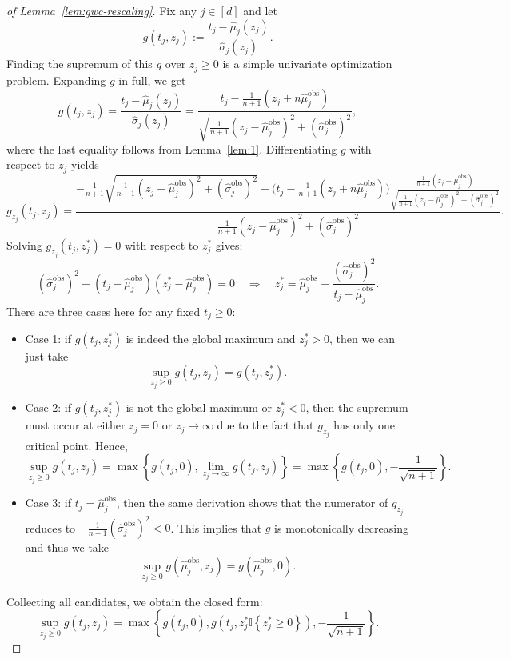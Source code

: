 \begin{proof}[of Lemma~\ref{lem:gwc-rescaling}]
Fix any $j\in [d]$ and let
\[
g(t_j, z_j) := \frac{t_j - \hat{\mu}_{j}(z_j)}{\hat{\sigma}_{j}(z_j)}.
\]
Finding the supremum of this $g$ over $z_j \geq 0$ is a simple univariate optimization problem. Expanding $g$ in full, we get
\[
g(t_j, z_j) = \frac{t_j - \hat{\mu}_{j}(z_j)}{\hat{\sigma}_{j}(z_j)} = \frac{t_j-\frac{1}{n+1}(z_j+n\hat{\mu}^\mathrm{obs}_j)}{\sqrt{\frac{1}{n+1}(z_j-\hat{\mu}^\mathrm{obs}_j)^2+(\hat{\sigma}^\mathrm{obs}_j)^2}},
\]
where the last equality follows from Lemma~\ref{lem:1}.
Differentiating $g$ with respect to $z_j$ yields
\[
g_{z_j}(t_j, z_j) = 
\frac{-\tfrac{1}{n+1}\sqrt{\frac{1}{n+1}(z_j-\hat{\mu}^\mathrm{obs}_j)^2+(\hat{\sigma}^\mathrm{obs}_j)^2} 
- \big(t_j - \tfrac{1}{n+1}(z_j+n\hat{\mu}^\mathrm{obs}_j)\big)\tfrac{\tfrac{1}{n+1}(z_j-\hat{\mu}^\mathrm{obs}_j)}{\sqrt{\frac{1}{n+1}(z_j-\hat{\mu}^\mathrm{obs}_j)^2+(\hat{\sigma}^\mathrm{obs}_j)^2}}}
{\frac{1}{n+1}(z_j-\hat{\mu}^\mathrm{obs}_j)^2+(\hat{\sigma}^\mathrm{obs}_j)^2}.
\]
Solving $g_{z_j}(t_j,z^*_j)=0$ with respect to $z^*_j$ gives:
\[
(\hat{\sigma}^\mathrm{obs}_j)^2 + (t_j-\hat{\mu}^\mathrm{obs}_j)(z^*_j-\hat{\mu}^\mathrm{obs}_j)=0
\quad\Longrightarrow\quad
z^\ast_j = \hat{\mu}^\mathrm{obs}_j - \frac{(\hat{\sigma}^\mathrm{obs}_j)^2}{t_j-\hat{\mu}^\mathrm{obs}_j}.
\]
There are three cases here for any fixed $t_j\geq 0$:
\begin{itemize}
    \item Case 1: if $g(t_j, z^\ast_j)$ is indeed the global maximum and $z^\ast_j > 0$, then we can just take
    \[
    \sup_{z_j \geq 0} g(t_j, z_j) = g(t_j, z^\ast_j).
    \]
    \item Case 2: if $g(t_j, z^\ast_j)$ is not the global maximum or $z^\ast_j < 0$, then the supremum must occur at either $z_j = 0$ or $z_j \rightarrow \infty$ due to the fact that $g_{z_j}$ has only one critical point. Hence,
    \[
    \sup_{z_j \geq 0} g(t_j, z_j) = \max\left\{g(t_j, 0), \lim_{z_j\to\infty} g(t_j,z_j)\right\} = \max\left\{g(t_j, 0), -\frac{1}{\sqrt{n+1}}\right\} .
    \]
    \item Case 3: if $t_j = \hat{\mu}^\mathrm{obs}_j$, then the same derivation shows that the numerator of $g_{z_j}$ reduces to $-\tfrac{1}{n+1}(\hat{\sigma}^\mathrm{obs}_j)^2 < 0$. This implies that $g$ is monotonically decreasing and thus we take
    \[
    \sup_{z_j \geq 0} g(\hat{\mu}^\mathrm{obs}_j, z_j) = g(\hat{\mu}^\mathrm{obs}_j, 0).
    \]
\end{itemize}

Collecting all candidates, we obtain the closed form:
\[
\sup_{z_j \geq 0} g(t_j, z_j)
=\max\left\{g\left(t_j, 0\right), g\left(t_j, z^*_j\mathbb{I}\left\{z^*_j \geq 0\right\}\right), -\frac{1}{\sqrt{n+1}}\right\}.
\]
\end{proof}


